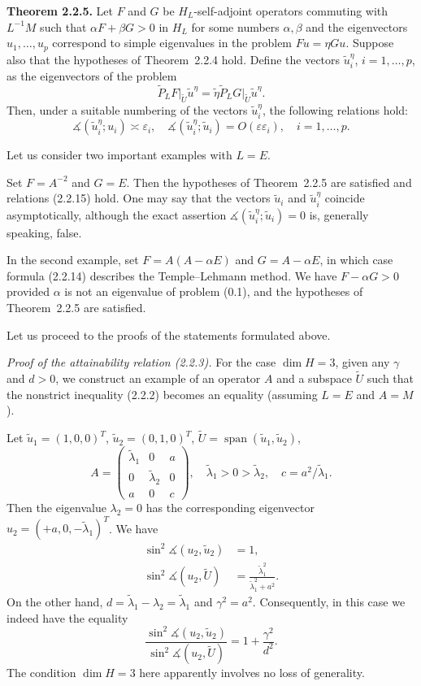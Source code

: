 \documentclass[11pt,oneside]{book}
\newcommand{\myspan}{\operatorname{span}}
\newcommand{\ang}{\measuredangle}
\begin{document}
\textbf{Theorem 2.2.5.} Let $F$ and $G$ be $H_L$-self-adjoint operators commuting with $L^{-1}M$ such that $\alpha F + \beta G > 0$ in $H_L$ for some numbers $\alpha, \beta$ and the eigenvectors $u_1, \ldots, u_p$ correspond to simple eigenvalues in the problem $Fu = \eta Gu$. Suppose also that the hypotheses of Theorem~2.2.4 hold. Define the vectors $\tilde{u}_i^\eta$, $i = 1, \ldots, p$, as the eigenvectors of the problem
\[
\widetilde{P}_L F \big|_{\widetilde{U}} \tilde{u}^\eta = \tilde{\eta} \widetilde{P}_L G \big|_{\widetilde{U}} \tilde{u}^\eta . \tag{2.2.14}
\]
Then, under a suitable numbering of the vectors $\tilde{u}_i^\eta$, the following relations hold:
\[
\ang(\tilde{u}_i^\eta; u_i) \asymp \varepsilon_i , \quad \ang(\tilde{u}_i^\eta; \tilde{u}_i) = O(\varepsilon \varepsilon_i), \quad i = 1, \ldots, p. \tag{2.2.15}
\]

Let us consider two important examples with $L = E$.

Set $F = A^{-2}$ and $G = E$. Then the hypotheses of Theorem~2.2.5 are satisfied and relations (2.2.15) hold. One may say that the vectors $\tilde{u}_i$ and $\tilde{u}_i^\eta$ coincide asymptotically, although the exact assertion $\ang(\tilde{u}_i^\eta; \tilde{u}_i) = 0$ \citep{Pissanetzky1984} is, generally speaking, false.

In the second example, set $F = A(A - \alpha E)$ and $G = A - \alpha E$, in which case formula (2.2.14) describes the Temple--Lehmann method. We have $F - \alpha G > 0$ provided $\alpha$ is not an eigenvalue of problem (0.1), and the hypotheses of Theorem~2.2.5 are satisfied.

Let us proceed to the proofs of the statements formulated above.

\textit{Proof of the attainability relation (2.2.3).} For the case $\dim H = 3$, given any $\gamma$ and $d > 0$, we construct an example of an operator $A$ and a subspace $\widetilde{U}$ such that the nonstrict inequality (2.2.2) becomes an equality (assuming $L = E$ and $A = M$).

Let $\tilde{u}_1 = (1, 0, 0)^T$, $\tilde{u}_2 = (0, 1, 0)^T$, $\widetilde{U} = \myspan(\tilde{u}_1, \tilde{u}_2)$,
\[
A = \begin{pmatrix} \tilde{\lambda}_1 & 0 & a \\ 0 & \tilde{\lambda}_2 & 0 \\ a & 0 & c \end{pmatrix} , \quad \tilde{\lambda}_1 > 0 > \tilde{\lambda}_2 , \quad c = a^2 / \tilde{\lambda}_1 .
\]
Then the eigenvalue $\lambda_2 = 0$ has the corresponding eigenvector $u_2 = (+a, 0, -\tilde{\lambda}_1)^T$. We have
\[
\begin{aligned}
\sin^2 \ang(u_2, \tilde{u}_2) &= 1 , \\
\sin^2 \ang(u_2, \widetilde{U}) &= \frac{\tilde{\lambda}_1^2}{\tilde{\lambda}_1^2 + a^2} .
\end{aligned}
\]
On the other hand, $d = \tilde{\lambda}_1 - \lambda_2 = \tilde{\lambda}_1$ and $\gamma^2 = a^2$. Consequently, in this case we indeed have the equality
\[
\frac{\sin^2 \ang(u_2, \tilde{u}_2)}{\sin^2 \ang(u_2, \widetilde{U})} = 1 + \frac{\gamma^2}{d^2} .
\]
The condition $\dim H = 3$ here apparently involves no loss of generality.
\end{document}
